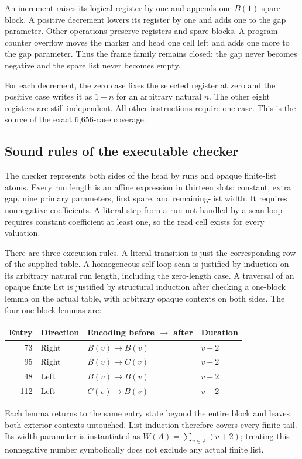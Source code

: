 \documentclass[11pt,a4paper]{article}
\begin{document}
An increment raises its logical register by one and appends one
$B(1)$ spare block. A positive decrement lowers its register by one
and adds one to the gap parameter. Other operations preserve registers
and spare blocks. A program-counter overflow moves the marker and
head one cell left and adds one more to the gap parameter. Thus the
frame family remains closed: the gap never becomes negative and the
spare list never becomes empty.

For each decrement, the zero case fixes the selected register at zero
and the positive case writes it as $1+n$ for an arbitrary natural $n$.
The other eight registers are still independent. All other instructions
require one case. This is the source of the exact 6,656-case coverage.

\subsection{Sound rules of the executable checker}

The checker represents both sides of the head by runs and opaque
finite-list atoms. Every run length is an affine expression in thirteen
slots: constant, extra gap, nine primary parameters, first spare, and
remaining-list width. It requires nonnegative coefficients. A literal
step from a run not handled by a scan loop requires constant coefficient
at least one, so the read cell exists for every valuation.

There are three execution rules. A literal transition is just the
corresponding row of the supplied table. A homogeneous self-loop scan
is justified by induction on its arbitrary natural run length,
including the zero-length case. A traversal of an opaque finite list
is justified by structural induction after checking a one-block lemma
on the actual table, with arbitrary opaque contexts on both sides.
The four one-block lemmas are:
\begin{center}
\begin{tabular}{rlll}
\toprule
Entry & Direction & Encoding before $\to$ after & Duration\\
\midrule
73 & Right & $B(v)\to B(v)$ & $v+2$\\
95 & Right & $B(v)\to C(v)$ & $v+2$\\
48 & Left & $B(v)\to B(v)$ & $v+2$\\
112 & Left & $C(v)\to B(v)$ & $v+2$\\
\bottomrule
\end{tabular}
\end{center}
Each lemma returns to the same entry state beyond the entire block
and leaves both exterior contexts untouched. List induction therefore
covers every finite tail. Its width parameter is instantiated as
$W(A)=\sum_{v\in A}(v+2)$; treating this nonnegative number symbolically
does not exclude any actual finite list.
\end{document}
